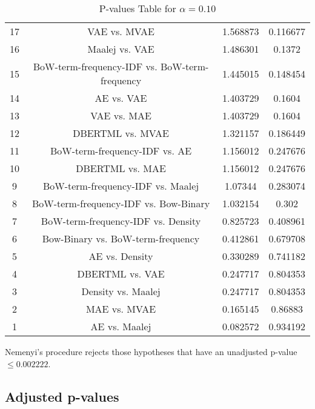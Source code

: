 \documentclass[a4paper,10pt]{article}
\begin{document}
\begin{landscape}
\begin{table}[!htp]
\begin{tabular}{cccc}
17&VAE vs. MVAE&1.568873&0.116677\\
16&Maalej vs. VAE&1.486301&0.1372\\
15&BoW-term-frequency-IDF vs. BoW-term-frequency&1.445015&0.148454\\
14&AE vs. VAE&1.403729&0.1604\\
13&VAE vs. MAE&1.403729&0.1604\\
12&DBERTML vs. MVAE&1.321157&0.186449\\
11&BoW-term-frequency-IDF vs. AE&1.156012&0.247676\\
10&DBERTML vs. MAE&1.156012&0.247676\\
9&BoW-term-frequency-IDF vs. Maalej&1.07344&0.283074\\
8&BoW-term-frequency-IDF vs. Bow-Binary&1.032154&0.302\\
7&BoW-term-frequency-IDF vs. Density&0.825723&0.408961\\
6&Bow-Binary vs. BoW-term-frequency&0.412861&0.679708\\
5&AE vs. Density&0.330289&0.741182\\
4&DBERTML vs. VAE&0.247717&0.804353\\
3&Density vs. Maalej&0.247717&0.804353\\
2&MAE vs. MVAE&0.165145&0.86883\\
1&AE vs. Maalej&0.082572&0.934192\\
\hline
\end{tabular}
\caption{P-values Table for $\alpha=0.10$}
\end{table}Nemenyi's procedure rejects those hypotheses that have an unadjusted p-value $\le0.002222$.

\pagebreak

\subsection{Adjusted p-values}


\end{landscape}
\end{document}
